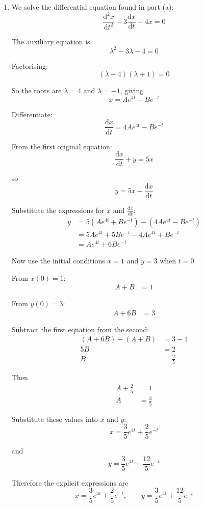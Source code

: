 \documentclass[leqno]{article}
\begin{document}
\begin{enumerate}[
  label=\textbf{\arabic*.},
  leftmargin=*,
  topsep=0pt,
  partopsep=0pt,
  parsep=0pt
]
\begin{djsSolution}
\begin{enumerate}[label=\textbf{(\alph*)}]
  \item We solve the differential equation found in part (a):
\[
\frac{\mathrm{d}^2x}{\mathrm{d}t^2}-3\frac{\mathrm{d}x}{\mathrm{d}t}-4x=0
\]

The auxiliary equation is
\[
\lambda^2-3\lambda-4=0
\]

Factorising:
\[
(\lambda-4)(\lambda+1)=0
\]

So the roots are $\lambda=4$ and $\lambda=-1$, giving
\[
x=Ae^{4t}+Be^{-t}
\]

Differentiate:
\[
\frac{\mathrm{d}x}{\mathrm{d}t}=4Ae^{4t}-Be^{-t}
\]

From the first original equation:
\[
\frac{\mathrm{d}x}{\mathrm{d}t}+y=5x
\]

so
\[
y=5x-\frac{\mathrm{d}x}{\mathrm{d}t}
\]

Substitute the expressions for $x$ and $\frac{\mathrm{d}x}{\mathrm{d}t}$:
\begin{align*}
y&=5\left(Ae^{4t}+Be^{-t}\right)-\left(4Ae^{4t}-Be^{-t}\right) \\
&=5Ae^{4t}+5Be^{-t}-4Ae^{4t}+Be^{-t} \\
&=Ae^{4t}+6Be^{-t}
\end{align*}

Now use the initial conditions $x=1$ and $y=3$ when $t=0$.

From $x(0)=1$:
\begin{align*}
A+B&=1
\end{align*}

From $y(0)=3$:
\begin{align*}
A+6B&=3
\end{align*}

Subtract the first equation from the second:
\begin{align*}
(A+6B)-(A+B)&=3-1 \\
5B&=2 \\
B&=\frac{2}{5}
\end{align*}

Then
\begin{align*}
A+\frac{2}{5}&=1 \\
A&=\frac{3}{5}
\end{align*}

Substitute these values into $x$ and $y$:
\[
x=\frac{3}{5}e^{4t}+\frac{2}{5}e^{-t}
\]

and
\[
y=\frac{3}{5}e^{4t}+\frac{12}{5}e^{-t}
\]

Therefore the explicit expressions are
\[
x=\frac{3}{5}e^{4t}+\frac{2}{5}e^{-t},
\qquad
y=\frac{3}{5}e^{4t}+\frac{12}{5}e^{-t}
\]
\end{enumerate}
\end{djsSolution}



\end{enumerate}
\end{document}
